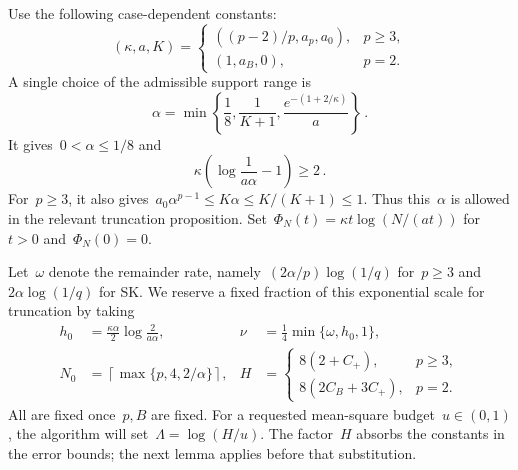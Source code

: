 \documentclass[10pt]{article}
\theoremstyle{plain}
\theoremstyle{definition}
\theoremstyle{remark}
\begin{document}
Use the following case-dependent constants:
\begin{equation*}
 (\kappa,a,K)=
 \begin{cases}((p-2)/p,a_p,a_0),&p\ge3,\\(1,a_B,0),&p=2.\end{cases}
\end{equation*}
A single choice of the admissible support range is
\begin{equation}\label{eq:uniform-alpha-choice}
 \alpha=\min\left\{\frac18,\frac1{K+1},\frac{e^{-(1+2/\kappa)}}a\right\}\,.
\end{equation}
It gives~$0<\alpha\le1/8$ and
\begin{equation}\label{eq:uniform-alpha}
 \kappa\left(\log\frac1{a\alpha}-1\right)\ge2\,.
\end{equation}
For~$p\ge3$, it also gives~$a_0\alpha^{p-1}\le K\alpha\le K/(K+1)\le1$. Thus this~$\alpha$ is allowed in the relevant truncation proposition. Set~$\Phi_N(t)=\kappa t\log(N/(at))$ for~$t>0$ and~$\Phi_N(0)=0$.

Let~$\omega$ denote the remainder rate, namely~$(2\alpha/p)\log(1/q)$ for~$p\ge3$ and~$2\alpha\log(1/q)$ for SK. We reserve a fixed fraction of this exponential scale for truncation by taking
\begin{align}
 h_0&=\frac{\kappa\alpha}{2}\log\frac2{a\alpha},&
 \nu&=\frac14\min\{\omega,h_0,1\},\label{eq:uniform-nu}\\
 N_0&=\left\lceil\max\{p,4,2/\alpha\}\right\rceil,&
 H&=\begin{cases}8(2+C_+),&p\ge3,\\8(2C_B+3C_+),&p=2.\end{cases}\label{eq:uniform-H}
\end{align}
All are fixed once~$p,B$ are fixed. For a requested mean-square budget~$u\in(0,1)$, the algorithm will set~$\Lambda=\log(H/u)$. The factor~$H$ absorbs the constants in the error bounds; the next lemma applies before that substitution.
\end{document}
